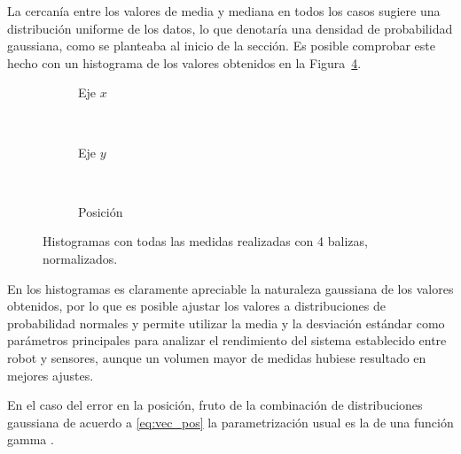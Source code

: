 La cercanía entre los valores de media y mediana en todos los casos sugiere una distribución uniforme de los datos, lo que denotaría una densidad de probabilidad gaussiana, como se planteaba al inicio de la sección.
Es posible comprobar este hecho con un histograma de los valores obtenidos en la Figura~\ref{fig:histogramas_lab_4sens}.
\begin{figure}[H]
    \hspace*{-0.5cm}
    \begin{subfigure}[b]{.3\textwidth}
      \centering
       
      \vspace*{-0.5cm}
      \caption{Eje $x$}
      \label{fig:histogramas_lab_4sens_x}
    \end{subfigure}
    ~~~~~~~~~
    \begin{subfigure}[b]{.3\textwidth}
      \centering
      
      \vspace*{-0.5cm}
      \caption{Eje $y$}
      \label{fig:histogramas_lab_4sens_y}
    \end{subfigure}
    ~~~~~
    \begin{subfigure}[b]{.3\textwidth}
        \centering
        
        \vspace*{-0.5cm}
        \caption{Posición}
        \label{fig:histogramas_lab_4sens_pos}
      \end{subfigure}
    \caption{Histogramas con todas las medidas realizadas con 4 balizas, normalizados.}
    \label{fig:histogramas_lab_4sens}
  \end{figure}

En los histogramas es claramente apreciable la naturaleza gaussiana de los valores obtenidos, por lo que es posible ajustar los valores a distribuciones de probabilidad normales y permite utilizar la media y la desviación estándar como parámetros principales para analizar el rendimiento del sistema establecido entre robot y sensores, aunque un volumen mayor de medidas hubiese resultado en mejores ajustes.

En el caso del error en la posición, fruto de la combinación de distribuciones gaussiana de acuerdo a \eqref{eq:vec_pos} la parametrización usual es la de una función gamma \cite{jimenez}.


